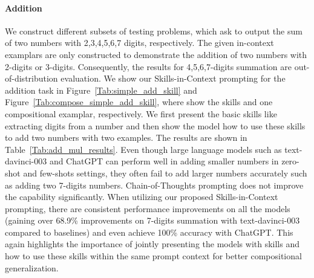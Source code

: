 \paragraph{Addition} We construct different subsets of testing problems, which ask to output the sum of two numbers with 2,3,4,5,6,7 digits, respectively. The given in-context examplars are only constructed to demonstrate the addition of two numbers with 2-digits or 3-digits. Consequently, the results for 4,5,6,7-digits summation are out-of-distribution evaluation. We show our Skills-in-Context prompting for the addition task in Figure~\ref{Tab:simple_add_skill} and Figure~\ref{Tab:compose_simple_add_skill}, where show the skills and one compositional examplar, respectively. We first present the basic skills like extracting digits from a number and then show the model how to use these skills to add two numbers with two examples. The results are shown in Table~\ref{Tab:add_mul_results}. Even though large language models such as text-davinci-003 and ChatGPT can perform well in adding smaller numbers in zero-shot and few-shots settings, they often fail to add larger numbers accurately such as adding two 7-digits numbers. Chain-of-Thoughts prompting does not improve the capability significantly. When utilizing our proposed Skills-in-Context prompting, there are consistent performance improvements on all the models (gaining over 68.9\% improvements on 7-digits summation with text-davinci-003 compared to baselines) and even achieve 100\% accuracy with ChatGPT. This again highlights the importance of jointly presenting the models with skills and how to use these skills within the same prompt context for better compositional generalization.




